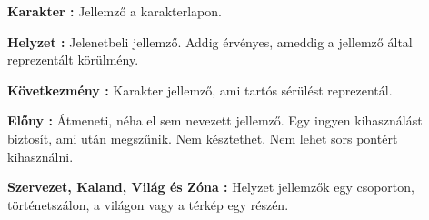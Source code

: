 \begin{multicols*}{2}

\textbf{Karakter :} Jellemző a karakterlapon.

\textbf{Helyzet :} Jelenetbeli jellemző. Addig érvényes, ameddig a jellemző által reprezentált körülmény.

\textbf{Következmény :} Karakter jellemző, ami tartós sérülést reprezentál.

\textbf{Előny :} Átmeneti, néha el sem nevezett jellemző. Egy ingyen kihasználást biztosít, ami után megszűnik. Nem késztethet. Nem lehet sors pontért kihasználni.

\textbf{Szervezet, Kaland, Világ és Zóna :} Helyzet jellemzők egy csoporton, történetszálon, a világon vagy a térkép egy részén.

\end{multicols*}
